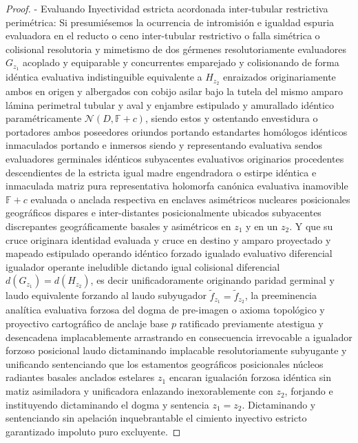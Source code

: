 \documentclass[11pt,a4paper]{article}
\theoremstyle{definition}
\theoremstyle{remark}
\numberwithin{equation}{section}
\begin{document}
\begin{proof}
- Evaluando Inyectividad estricta acordonada inter-tubular restrictiva perimétrica: Si presumiésemos la ocurrencia de intromisión e igualdad espuria evaluadora en el reducto o ceno inter-tubular restrictivo o falla simétrica o colisional resolutoria y mimetismo de dos gérmenes resolutoriamente evaluadores $G_{z_1}$ acoplado y equiparable y concurrentes emparejado y colisionando de forma idéntica evaluativa indistinguible equivalente a $H_{z_2}$ enraizados originariamente ambos en origen y albergados con cobijo asilar bajo la tutela del mismo amparo lámina perimetral tubular y aval y enjambre estipulado y amurallado idéntico paramétricamente $\mathcal{N}(D, \mathbb{F} + c)$, siendo estos y ostentando envestidura o portadores ambos poseedores oriundos portando estandartes homólogos idénticos inmaculados portando e inmersos siendo y representando evaluativa sendos evaluadores germinales idénticos subyacentes evaluativos originarios procedentes descendientes de la estricta igual madre engendradora o estirpe idéntica e inmaculada matriz pura representativa holomorfa canónica evaluativa inamovible $\mathbb{F} + c$ evaluada o anclada respectiva en enclaves asimétricos nucleares posicionales geográficos dispares e inter-distantes posicionalmente ubicados subyacentes discrepantes geográficamente basales y asimétricos en $z_1$ y en un $z_2$. Y que su cruce originara identidad evaluada y cruce en destino y amparo proyectado y mapeado estipulado operando idéntico forzado igualado evaluativo diferencial igualador operante ineludible dictando igual colisional diferencial $d(G_{z_1}) = d(H_{z_2})$, es decir unificadoramente originando paridad germinal y laudo equivalente forzando al laudo subyugador $\widetilde{f}_{z_1} = \widetilde{f}_{z_2}$, la preeminencia analítica evaluativa forzosa del dogma de pre-imagen o axioma topológico y proyectivo cartográfico de anclaje base $p$ ratificado previamente atestigua y desencadena implacablemente arrastrando en consecuencia irrevocable a igualador forzoso posicional laudo dictaminando implacable resolutoriamente subyugante y unificando sentenciando que los estamentos geográficos posicionales núcleos radiantes basales anclados estelares $z_1$ encaran igualación forzosa idéntica sin matiz asimiladora y unificadora enlazando inexorablemente con $z_2$, forjando e instituyendo dictaminando el dogma y sentencia $z_1 = z_2$. Dictaminando y sentenciando sin apelación inquebrantable el cimiento inyectivo estricto garantizado impoluto puro excluyente.

\end{proof}
\end{document}
